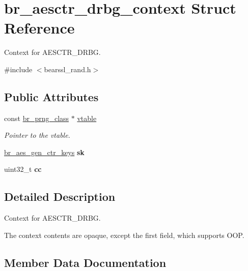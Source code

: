 \hypertarget{structbr__aesctr__drbg__context}{}\section{br\+\_\+aesctr\+\_\+drbg\+\_\+context Struct Reference}
\label{structbr__aesctr__drbg__context}


Context for A\+E\+S\+C\+T\+R\+\_\+\+D\+R\+BG.  




{\ttfamily \#include $<$bearssl\+\_\+rand.\+h$>$}

\subsection*{Public Attributes}
\begin{DoxyCompactItemize}
\item 
const \hyperlink{bearssl__rand_8h_a249aef3beeba050eea56048e6a479fba}{br\+\_\+prng\+\_\+class} $\ast$ \hyperlink{structbr__aesctr__drbg__context_a226fd8f8f1eb58a04734402668aa3a74}{vtable}
\begin{DoxyCompactList}\small\item\em Pointer to the vtable. \end{DoxyCompactList}\item 
\mbox{\label{structbr__aesctr__drbg__context_ae5ecd086e30ea3fecf0d1b6da4427cd6}} 
\hyperlink{unionbr__aes__gen__ctr__keys}{br\+\_\+aes\+\_\+gen\+\_\+ctr\+\_\+keys} {\bfseries sk}
\item 
\mbox{\label{structbr__aesctr__drbg__context_a2708a8657993221e6b54ef0b939a2287}} 
uint32\+\_\+t {\bfseries cc}
\end{DoxyCompactItemize}


\subsection{Detailed Description}
Context for A\+E\+S\+C\+T\+R\+\_\+\+D\+R\+BG. 

The context contents are opaque, except the first field, which supports O\+OP. 

\subsection{Member Data Documentation}
\mbox{\label{structbr__aesctr__drbg__context_a226fd8f8f1eb58a04734402668aa3a74}} 
